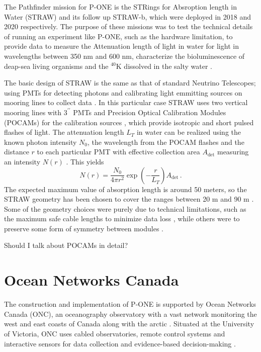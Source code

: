 The Pathfinder mission for P-ONE is the STRings for Absroption length in Water (STRAW) and its follow up STRAW-b, which were deployed in 2018 and 2020 respectively. The purpose of these missions was to test the technical details of running an experiment like P-ONE, such as the hardware limitation, to provide data to measure the Attenuation length of light in water for light in wavelengths between 350 nm and 600 nm, characterize the bioluminescence of deap-sea living organisms and the $^{40}$K dissolved in the salty water \cite{straw}.

The basic design of STRAW is the same as that of standard Neutrino Telescopes; using PMTs for detecting photons and calibrating light emmitting sources on mooring lines to collect data \cite{straw}. In this particular case STRAW uses two vertical mooring lines with $3^{\prime\prime}$ PMTs and Precision Optical Calibration Modules (POCAMs) for the calibration sources \cite{straw}, which provide isotropic and short pulsed flashes of light. The attenuation length $L_{T}$ in water can be realized using the known photon intensity $N_{0}$, the wavelength from the POCAM flashes and the distance $r$ to each particular PMT with effective collection area $A_{\text{det}}$ measuring an intensity $N(r)$ \cite{straw}. This yields
\begin{equation}
  N(r) = \frac{N_{0}}{4\pi r^{2}}\exp\left(-\frac{r}{L_{T}}\right)A_{\text{det}}\, .
\end{equation}
The expected maximum value of absorption length is around 50 meters, so the STRAW geometry has been chosen to cover the ranges between 20 m and 90 m \cite{straw}. Some of the geometry choices were purely due to technical limitations, such as the maximum safe cable lengths to minimize data loss \cite{straw}, while others were to preserve some form of symmetry between modules \cite{straw}.

Should I talk about POCAMs in detail? \cite{pocam}

\section{Ocean Networks Canada}

The construction and implementation of P-ONE is supported by Ocean Networks Canada (ONC), an oceanography observatory with a vast network monitoring the west and east coasts of Canada along with the arctic \cite{onc}. Situated at the University of Victoria, ONC uses cabled observatories, remote control systems and interactive sensors for data collection and evidence-based decision-making \cite{onc}. 

